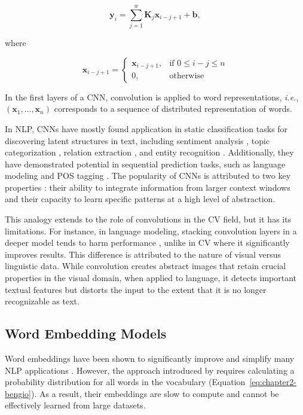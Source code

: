 \begin{equation}
    \bm{y}_i = \sum_{j=1}^w \bm{K}_j \bm{x}_{i-j+1} + \bm{b},
\end{equation}

\noindent where

\[
    \bm{x}_{i-j+1} = 
        \begin{cases}
            \bm{x}_{i-j+1}, & \text{if } 0 \leq i-j \leq n \\
            0,              & \text{otherwise}
        \end{cases}
\]

In the first layers of a \ac{CNN}, convolution is applied to word representations, \textit{i.e.}, $(\bm{x}_1, \ldots, \bm{x}_n)$ corresponds to a sequence of distributed representation of words. 

In \ac{NLP}, \acp{CNN} have mostly found application in static classification tasks for discovering latent structures in text, including sentiment analysis \citep{kalchbrenner2014convolutional}, topic categorization \citep{kim2014convolutional}, relation extraction \citep{nguyen2015relation}, and entity recognition \citep{adel2016comparing}. Additionally, they have demonstrated potential in sequential prediction tasks, such as language modeling \citep{pham2016convolutional} and \ac{POS} tagging \citep{collobert2011natural}. The popularity of \acp{CNN} is attributed to two key properties \citep{pham2016convolutional}: their ability to integrate information from larger context windows and their capacity to learn specific patterns at a high level of abstraction.

This analogy extends to the role of convolutions in the \ac{CV} field, but it has its limitations. For instance, in language modeling, stacking convolution layers in a deeper model tends to harm performance \citep{pham2016convolutional}, unlike in \ac{CV} where it significantly improves results. This difference is attributed to the nature of visual versus linguistic data. While convolution creates abstract images that retain crucial properties in the visual domain, when applied to language, it detects important textual features but distorts the input to the extent that it is no longer recognizable as text.

\subsection{Word Embedding Models}

Word embeddings have been shown to significantly improve and simplify many \ac{NLP} applications \citep{collobert2011natural}. However, the approach introduced by \citet{bengio2000neural} requires calculating a probability distribution for all words in the vocabulary (Equation~\ref{eq:chapter2-bengio}). As a result, their embeddings are slow to compute and cannot be effectively learned from large datasets. 

